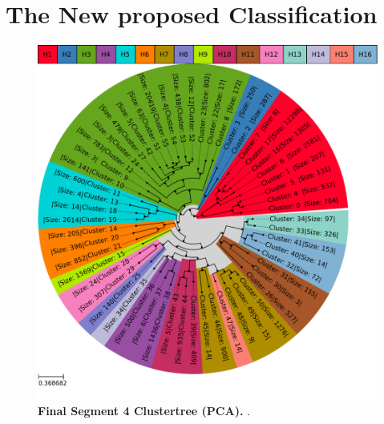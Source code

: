 \section{The New proposed Classification} \label{sec:Serotype_Classification}

\blindtext


\begin{figure}[!hbt]
    \centering
    \includegraphics[width=\textwidth, draft]{Results/Clustertree_Segment_4.pdf}
    \caption[Final Segment 4 Clustertree (\Acrshort{PCA})]{\textbf{Final Segment 4 Clustertree (\Acrshort{PCA}).} .}
\end{figure}